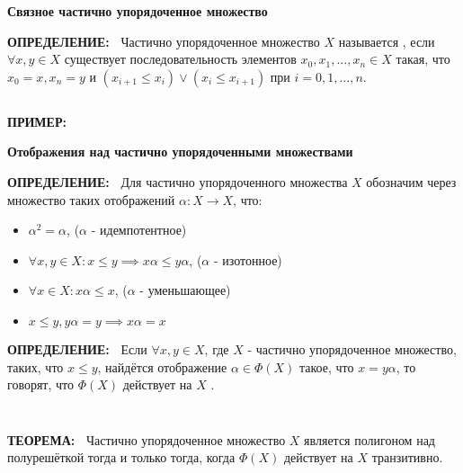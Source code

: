 \documentclass{beamer}
\newcommand{\green}{\color[rgb]{0,0.4,0}}
\newcommand{\blue}{\color{blue}}
\newcommand{\statement}{%
	 {\bf \green УТВЕРЖДЕНИЕ:\ }}
\newcommand{\theor}{%
     {\bf \green ТЕОРЕМА:\ }}
\newcommand{\definit}{%
     {\bf \green ОПРЕДЕЛЕНИЕ:\ }}
\newcommand{\examp}{%
     {\bf \green ПРИМЕР:\ }}
\newcommand{\retline}{
	
$ $

}
\begin{document}
\begin{frame}
{\bf {\blue} Связное частично упорядоченное множество }

{\definit}
Частично упорядоченное множество $X$ называется \textit{\blue{связным}},
если $\forall x,y \in X$ существует последовательность элементов
$x_0,x_1, ... ,x_n \in X$ такая, что $x_0 = x, x_n = y$ и
$(x_{i+1} \leq x_i) \lor (x_i \leq x_{i+1})$ при 
$i = 0,1, ... , n$.

{\retline}

{\examp}

\begin{center}
\end{center}
\end{frame}

\begin{frame}
{\bf {\blue} Отображения над частично упорядоченными множествами}

{\definit}
Для частично упорядоченного множества $X$ обозначим через \textit{\blue{$\Phi(X)$}} множество таких отображений $\alpha : X \rightarrow X$, что:
\begin{itemize}
\item 
$\alpha^2 = \alpha$, ($\alpha$ - идемпотентное)
\item 
$\forall x,y \in X: x \leq y \implies x\alpha \leq y\alpha$, ($\alpha$ - изотонное)
\item 
$\forall x \in X: x\alpha \leq x$, ($\alpha$ - уменьшающее)
\item 
$x \leq y, y\alpha = y \implies x\alpha = x$
\end{itemize}
\end{frame}

\begin{frame}

{\definit}
Если $\forall x, y \in X$, где $X$ - частично упорядоченное множество, таких, что $x \leq y$, найдётся отображение $\alpha \in \Phi(X)$ такое, что $x = y\alpha$, то говорят, что $\Phi(X)$ действует на $X$ \textit{\blue{транзитивно}}.
{\retline}


{\retline}

{\theor}
Частично упорядоченное множество $X$ является полигоном над полурешёткой тогда и только тогда, когда $\Phi(X)$ действует на $X$ транзитивно.
\end{frame}
\end{document}
